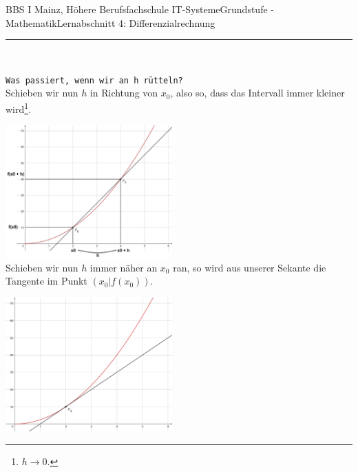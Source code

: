 \documentclass[11pt,twocolumn,oneside,openany,headings=optiontotoc,11pt,numbers=noenddot,final]{article}
\begin{document}
\begin{worksheet}{BBS I Mainz, Höhere Berufsfachschule IT-Systeme}{Grundstufe - Mathematik}{Lernabschnitt 4: Differenzialrechnung}
		\rule{0.48\textwidth}{0.1pt}\\
		\par\noindent
		\texttt{Was passiert, wenn wir an h rütteln?}\\
		Schieben wir nun \(h\) in Richtung von \(x_0\), also so, dass das Intervall immer kleiner wird\footnote{\(h\rightarrow{}0\).}.\\
		\par\noindent
		\includegraphics[width=0.48\textwidth]{../99_Bilder/04_Skr_DiffQuo_2.jpg}\\
		Schieben wir nun \(h\) immer näher an \(x_0\) ran\footnotemark[1], so wird aus unserer Sekante die Tangente im Punkt \((x_0|f(x_0))\).\\
		\par\noindent
		\includegraphics[width=0.48\textwidth]{../99_Bilder/04_Tang.png}\\

\end{worksheet}
\end{document}
